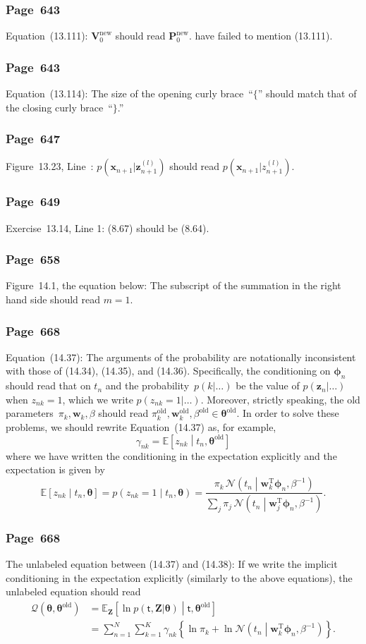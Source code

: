 \documentclass[12pt,a4paper]{article}
\newcommand{\erratum}[1]{\subsubsection*{#1}}
\begin{document}
\erratum{Page~643}
Equation~(13.111):
$\mathbf{V}_{0}^{\text{new}}$ should read $\mathbf{P}_{0}^{\text{new}}$.
\citet{Svensen:PRML_errata} have failed to mention (13.111).

\erratum{Page~643}
Equation~(13.114): The size of the opening curly brace~``$\{$'' should match
that of the closing curly brace~``$\}$.''

\erratum{Page~647}
Figure~13.23, Line~:
$p(\mathbf{x}_{n+1}|\mathbf{z}_{n+1}^{(l)})$ should read $p(\mathbf{x}_{n+1}|{z}_{n+1}^{(l)})$.

\erratum{Page~649}
Exercise~13.14, Line 1: (8.67) should be (8.64).

\erratum{Page~658}
Figure~14.1, the equation below:
The subscript of the summation in the right hand side should read $m = 1$.

\erratum{Page~668}
Equation~(14.37):
The arguments of the probability are notationally inconsistent with those of (14.34), (14.35),
and (14.36).
Specifically, the conditioning on $\bm{\phi}_n$ should read that on $t_n$ and
the probability~$p(k|\dots)$ be the value of $p(\mathbf{z}_{n}|\dots)$ when $z_{nk} = 1$,
which we write $p(z_{nk} = 1|\dots)$.
Moreover, strictly speaking,
the old parameters~$\pi_k, \mathbf{w}_k, \beta$ should read
$\pi_k^{\text{old}}, \mathbf{w}_k^{\text{old}}, \beta^{\text{old}} \in \bm{\theta}^{\text{old}}$.
In order to solve these problems, we should rewrite Equation~(14.37) as, for example,
\begin{equation}
\gamma_{nk} = \mathbb{E}\left[ z_{nk} \middle| t_n, \bm{\theta}^{\text{old}} \right]
\label{eq:correction_to_(14.37)_part_one}
\end{equation}
where we have written the conditioning in the expectation explicitly and
the expectation is given by
\begin{equation}
\mathbb{E}\left[ z_{nk} \middle| t_n, \bm{\theta} \right]
  = p\left( z_{nk} = 1 \middle| t_n, \bm{\theta} \right)
  = \frac{\pi_k \,
      \mathcal{N}\left(t_n\middle|\mathbf{w}_k^{\operatorname{T}}\bm{\phi}_n, \beta^{-1}\right)}{
    \sum_j \pi_j \,
      \mathcal{N}\left(t_n\middle|\mathbf{w}_j^{\operatorname{T}}\bm{\phi}_n, \beta^{-1}\right)}.
\label{eq:correction_to_(14.37)_part_two}
\end{equation}

\erratum{Page~668}
The unlabeled equation between (14.37) and (14.38):
If we write the implicit conditioning in the expectation explicitly
(similarly to the above equations), the unlabeled equation should read
\begin{align}
\mathcal{Q}\left(\bm{\theta}, \bm{\theta}^{\text{old}}\right)
  &= \mathbb{E}_{\mathbf{Z}}\left[ \ln p(\bm{\mathsf{t}}, \mathbf{Z}|\bm{\theta}) \middle|
       \bm{\mathsf{t}}, \bm{\theta}^{\text{old}} \right]
    \label{eq:correction_to_unlabeled_equation_between_(14.37)_and_(14.38)} \\
  &= \sum_{n=1}^{N} \sum_{k=1}^{K} \gamma_{nk}
     \left\{ \ln\pi_{k} +
     \ln\mathcal{N}\left(t_n \middle|
     \mathbf{w}_k^{\operatorname{T}}\bm{\phi}_n, \beta^{-1} \right) \right\} .
\end{align}
\end{document}
